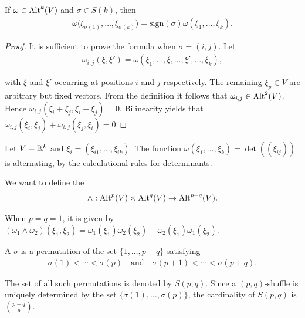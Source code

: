 \begin{lemma}\label{lemma:2-2}
  If $\omega\in\operatorname{Alt}^k(V)$ and $\sigma\in S(k)$, then
  \begin{align*}
    \omega\big(\xi_{\sigma(1)},\ldots,\xi_{\sigma(k)}\big)=\mathrm{sign}(\sigma)\omega(\xi_{1},\ldots,\xi_{k}).
  \end{align*}
\end{lemma}

\begin{proof}
  It is sufficient to prove the formula when $\sigma = (i, j)$. Let
  \begin{align*}
    \omega_{i,j}(\xi,\xi')=\omega(\xi_{1},\ldots,\xi,\ldots,\xi',\ldots,\xi_{k}),
  \end{align*}

  with $\xi$ and $\xi'$ occurring at positions $i$ and $j$ respectively. The remaining $\xi_p\in V$
  are arbitrary but fixed vectors. From the definition it follows that $\omega_{i,j}\in\operatorname{Alt}^2(V)$.
  Hence $\omega_{i,j} (\xi_i + \xi_j, \xi_i + \xi_j) = 0$. Bilinearity yields that
  $\omega_{i,j} (\xi_i, \xi_j) + \omega_{i,j} (\xi_j, \xi_i) = 0$
\end{proof}


\begin{example}\label{example:2-3}
  Let $V = {\mathbb{R}}^k$ and $\xi_i = (\xi_{i1}, \ldots, \xi_{ik})$. The function $\omega(\xi_1, \ldots, \xi_k) = \det((\xi_{ij}))$
  is alternating, by the calculational rules for determinants.
\end{example}

We want to define the 
\begin{align*}
  \wedge: \operatorname{Alt}^p(V)\times\operatorname{Alt}^q(V) \to \operatorname{Alt}^{p+q}(V).
\end{align*}

When $p=q=1$, it is given by $(\omega_1\wedge\omega_2)(\xi_1,\xi_2) = \omega_1(\xi_1)\omega_2(\xi_2) - \omega_2(\xi_1)\omega_1(\xi_2)$.

\begin{definition}\label{definition:2-4}
  A  $\sigma$ is a permutation of the set $\{1, \ldots, p + q\}$ satisfying
  \begin{align*}
    \sigma(1) < \cdots < \sigma(p) \quad\text{and}\quad \sigma(p + 1) < \cdots < \sigma(p + q).
  \end{align*}

  The set of all such permutations is denoted by $S(p, q)$. Since a $(p, q)$-shuffle is uniquely determined by the
  set $\{\sigma(1),\ldots,\sigma(p)\}$, the cardinality of $S(p, q)$ is $\binom{p + q}{p}$.
\end{definition}


